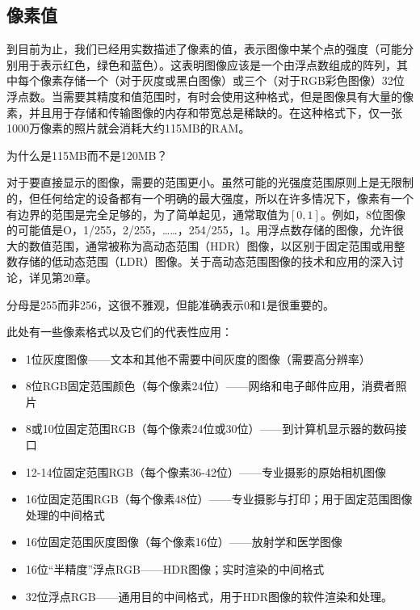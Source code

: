 \documentclass[lang=cn,12pt]{elegantbook}
\begin{document}
\subsection{像素值}

到目前为止，我们已经用实数描述了像素的值，表示图像中某个点的强度（可能分别用于表示红色，绿色和蓝色）。这表明图像应该是一个由浮点数组成的阵列，其中每个像素存储一个（对于灰度或黑白图像）或三个（对于RGB彩色图像）32位浮点数。当需要其精度和值范围时，有时会使用这种格式，但是图像具有大量的像素，并且用于存储和传输图像的内存和带宽总是稀缺的。在这种格式下，仅一张1000万像素的照片就会消耗大约115MB的RAM。

\begin{note}
  为什么是115MB而不是120MB？
\end{note}

对于要直接显示的图像，需要的范围更小。虽然可能的光强度范围原则上是无限制的，但任何给定的设备都有一个明确的最大强度，所以在许多情况下，像素有一个有边界的范围是完全足够的，为了简单起见，通常取值为$[0,1]$。例如，8位图像的可能值是O，1/255，2/255，……，254/255，1。用浮点数存储的图像，允许很大的数值范围，通常被称为高动态范围（HDR）图像，以区别于固定范围或用整数存储的低动态范围（LDR）图像。关于高动态范围图像的技术和应用的深入讨论，详见第20章。

\begin{note}
  分母是255而非256，这很不雅观，但能准确表示0和1是很重要的。
\end{note}

此处有一些像素格式以及它们的代表性应用：

\begin{itemize}
  \item 1位灰度图像——文本和其他不需要中间灰度的图像（需要高分辨率）
  \item 8位RGB固定范围颜色（每个像素24位）——网络和电子邮件应用，消费者照片
  \item 8或10位固定范围RGB（每个像素24位或30位）——到计算机显示器的数码接口
  \item 12-14位固定范围RGB（每个像素36-42位）——专业摄影的原始相机图像
  \item 16位固定范围RGB（每个像素48位）——专业摄影与打印；用于固定范围图像处理的中间格式
  \item 16位固定范围灰度图像（每个像素16位）——放射学和医学图像
  \item 16位“半精度”浮点RGB——HDR图像；实时渲染的中间格式
  \item 32位浮点RGB——通用目的中间格式，用于HDR图像的软件渲染和处理。
\end{itemize}
\end{document}
